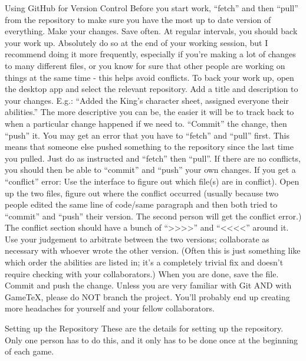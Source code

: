 Using GitHub for Version Control
Before you start work, “fetch” and then “pull” from the repository to make sure you have the most up to date version of everything.
Make your changes. Save often.
At regular intervals, you should back your work up. Absolutely do so at the end of your working session, but I recommend doing it more frequently, especially if you’re making a lot of changes to many different files, or you know for sure that other people are working on things at the same time - this helps avoid conflicts.
To back your work up, open the desktop app and select the relevant repository.
Add a title and description to your changes. E.g.: “Added the King’s character sheet, assigned everyone their abilities.” The more descriptive you can be, the easier it will be to track back to when a particular change happened if we need to.
“Commit” the change, then “push” it. You may get an error that you have to “fetch” and “pull” first. This means that someone else pushed something to the repository since the last time you pulled. Just do as instructed and “fetch” then “pull”. If there are no conflicts, you should then be able to “commit” and “push” your own changes.
If you get a “conflict” error:
Use the interface to figure out which file(s) are in conflict). Open up the two files, figure out where the conflict occurred (usually because two people edited the same line of code/same paragraph and then both tried to “commit” and “push” their version. The second person will get the conflict error.) The conflict section should have a bunch of “>>>>” and “<<<<” around it.
Use your judgement to arbitrate between the two versions; collaborate as necessary with whoever wrote the other version. (Often this is just something like which order the abilities are listed in; it’s a completely trivial fix and doesn’t require checking with your collaborators.) When you are done, save the file.
Commit and push the change.
Unless you are very familiar with Git AND with GameTeX, please do NOT branch the project. You’ll probably end up creating more headaches for yourself and your fellow collaborators.

Setting up the Repository
These are the details for setting up the repository. Only one person has to do this, and it only has to be done once at the beginning of each game.

